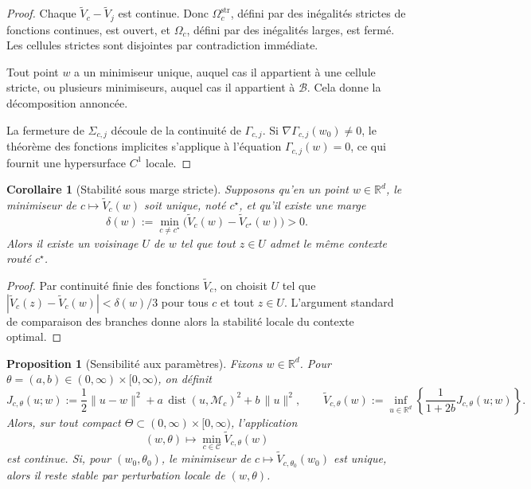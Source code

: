 \documentclass[11pt,a4paper]{article}
\newtheorem{proposition}{Proposition}[section]
\newtheorem{corollary}{Corollaire}[section]
\DeclareMathOperator{\dist}{dist}
\newcommand{\R}{\mathbb R}
\newcommand{\Mcal}{\mathcal M}
\newcommand{\Ccal}{\mathcal C}
\newcommand{\Bcal}{\mathcal B}
\begin{document}
\begin{proof}
Chaque \(\widetilde V_c-\widetilde V_j\) est continue. Donc \(\Omega_c^{\mathrm{str}}\), défini par des inégalités strictes de fonctions continues, est ouvert, et \(\Omega_c\), défini par des inégalités larges, est fermé. Les cellules strictes sont disjointes par contradiction immédiate.

Tout point \(w\) a un minimiseur unique, auquel cas il appartient à une cellule stricte, ou plusieurs minimiseurs, auquel cas il appartient à \(\Bcal\). Cela donne la décomposition annoncée.

La fermeture de \(\Sigma_{c,j}\) découle de la continuité de \(\Gamma_{c,j}\). Si \(\nabla\Gamma_{c,j}(w_0)\neq 0\), le théorème des fonctions implicites s'applique à l'équation \(\Gamma_{c,j}(w)=0\), ce qui fournit une hypersurface \(C^1\) locale.
\end{proof}

\begin{corollary}[Stabilité sous marge stricte]
Supposons qu'en un point \(w\in\R^d\), le minimiseur de \(c\mapsto \widetilde V_c(w)\) soit unique, noté \(c^\star\), et qu'il existe une marge
\[
\delta(w):=\min_{c\neq c^\star}\bigl(\widetilde V_c(w)-\widetilde V_{c^\star}(w)\bigr)>0.
\]
Alors il existe un voisinage \(U\) de \(w\) tel que tout \(z\in U\) admet le même contexte routé \(c^\star\).
\end{corollary}

\begin{proof}
Par continuité finie des fonctions \(\widetilde V_c\), on choisit \(U\) tel que \(|\widetilde V_c(z)-\widetilde V_c(w)|<\delta(w)/3\) pour tous \(c\) et tout \(z\in U\). L'argument standard de comparaison des branches donne alors la stabilité locale du contexte optimal.
\end{proof}

\begin{proposition}[Sensibilité aux paramètres]
Fixons \(w\in\R^d\). Pour \(\theta=(a,b)\in(0,\infty)\times[0,\infty)\), on définit
\[
J_{c,\theta}(u;w)
:=
\frac12\|u-w\|^2+a\,\dist(u,\Mcal_c)^2+b\,\|u\|^2,
\qquad
\widetilde V_{c,\theta}(w)
:=
\inf_{u\in\R^d}
\left\{
\frac{1}{1+2b}J_{c,\theta}(u;w)
\right\}.
\]
Alors, sur tout compact \(\Theta\subset(0,\infty)\times[0,\infty)\), l'application
\[
(w,\theta)\longmapsto \min_{c\in\Ccal}\widetilde V_{c,\theta}(w)
\]
est continue. Si, pour \((w_0,\theta_0)\), le minimiseur de \(c\mapsto \widetilde V_{c,\theta_0}(w_0)\) est unique, alors il reste stable par perturbation locale de \((w,\theta)\).
\end{proposition}
\end{document}
